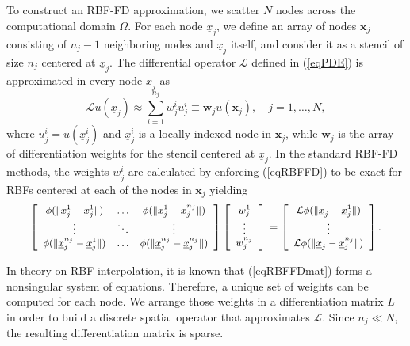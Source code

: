 \documentclass{UUThesisTemplate}
\begin{document}
\par
To construct an RBF-FD approximation, we scatter $N$ nodes across the computational domain $\Omega$. For each node $\underline{x}_j$, we define an array of nodes $\mathbf{x}_j$ consisting of $n_j-1$ neighboring nodes and $\underline{x}_j$ itself, and consider it as a stencil of size $n_j$ centered at $\underline{x}_j$. The differential operator $\mathcal{L}$ defined in (\ref{eqPDE})  is approximated in every node  $\underline{x}_j$ as
\begin{equation}
\mathcal{L}u(\underline{x}_j)\approx\sum_{i=1}^{n_j}{w}_{j}^{i}u_j^{i}\equiv \mathbf{w}_ju(\mathbf{x}_j),\quad j=1,\ldots,N,
\label{eqRBFFD}
\end{equation}
where $u_j^{i}=u(\underline{x}_j^i)$ and $\underline{x}_j^i$ is a locally indexed node in $\mathbf{x}_j$, while $\mathbf{w}_j$ is the array of differentiation weights for the stencil centered at $\underline{x}_j$. In the standard RBF-FD methods, the weights ${w}_j^i$ are calculated by enforcing (\ref{eqRBFFD}) to be exact for RBFs centered at each of the nodes in $\mathbf{x}_j$ yielding
\begin{equation}
\label{eqRBFFDmat}
{\footnotesize{
\left[\begin{array}{cccc}
\phi(\|\underline{x}_j^{1}-\underline{x}_j^{1}\|) & \ldots & \phi(\|\underline{x}_j^{1}-\underline{x}_{j}^{n_j}\|)\\
\vdots & \ddots & \vdots\\
\phi(\|\underline{x}_{j}^{n_j}-\underline{x}_j^{1}\|) & \ldots & \phi(\|\underline{x}_{j}^{n_j}-\underline{x}_{j}^{n_j}\|)
\end{array}\right]
\left[\begin{array}{c}
{w}_j^{1}\\
\vdots\\
{w}_{j}^{n_j}
\end{array}\right]=
\left[\begin{array}{c}
\mathcal{L}\phi(\|\underline{x}_{j}-\underline{x}_j^{1}\|)\\
\vdots \\
\mathcal{L}\phi(\|\underline{x}_{j}-\underline{x}_{{j}}^{n_j}\|)
\end{array}\right].}}
\end{equation}

In theory on RBF interpolation, it is known that (\ref{eqRBFFDmat}) forms a nonsingular system of equations. Therefore, a unique set of weights can be computed for each node. We arrange those weights in a differentiation matrix $L$ in order to build a discrete spatial operator that approximates $\mathcal{L}$. Since $n_j \ll N$, the resulting differentiation matrix is sparse.
\end{document}
